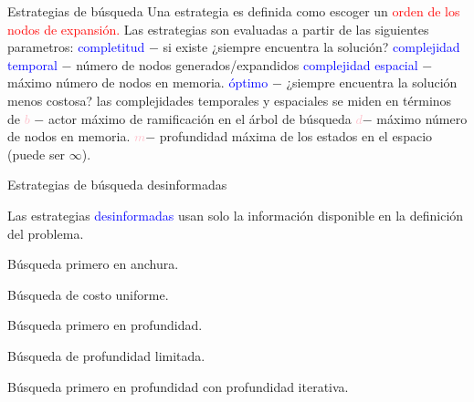 \documentclass{beamer}
\theoremstyle{definition}
\theoremstyle{theorem}
\theoremstyle{remark}
\begin{document}
\begin{frame}{Estrategias de búsqueda}
    Una estrategia es definida como escoger un  \textcolor{red}{orden de los nodos de expansión.} \newline
    Las estrategias son evaluadas a partir de las siguientes parametros:\newline
    \blank{1cm}\textcolor{blue}{completitud} $-$ si existe ¿siempre encuentra la solución? \newline
    \blank{1cm}\textcolor{blue}{complejidad temporal} $-$ número de nodos generados/expandidos\newline
    \blank{1cm}\textcolor{blue}{complejidad espacial} $-$ máximo número de nodos en memoria.\newline
    \blank{1cm}\textcolor{blue}{óptimo} $-$ ¿siempre encuentra la solución menos costosa?\newline
    las complejidades temporales y espaciales se miden en términos de\newline
    \blank{1cm}\textcolor{pink}{$b$} $-$ actor máximo de ramificación en el árbol de búsqueda
    \newline
    \blank{1cm}\textcolor{pink}{$d$}$-$ máximo número de nodos en memoria.\newline
    \blank{1cm}\textcolor{pink}{$m$}$-$ profundidad máxima de los estados en el espacio (puede ser $\infty$).\newline
\end{frame}

\begin{frame}{Estrategias de búsqueda desinformadas}
    
      
    Las estrategias \textcolor{blue}{desinformadas} usan solo la información disponible en la definición del problema.
    \bigskip
    \bigskip
        
    Búsqueda primero en anchura.
    \bigskip
        
    Búsqueda de costo uniforme.
    \bigskip
        
    Búsqueda primero en profundidad.
    \bigskip
        
    Búsqueda de profundidad limitada.
    \bigskip
        
    Búsqueda primero en profundidad con profundidad iterativa.
    
        
\end{frame}
\end{document}
